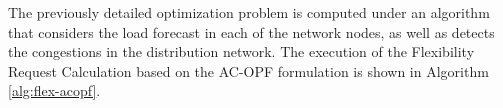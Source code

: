 \newpage
The previously detailed optimization problem is computed under an algorithm that considers the load forecast in each of the network nodes, as well as detects the congestions in the distribution network. The execution of the Flexibility Request Calculation based on the AC-OPF formulation is shown in Algorithm \ref{alg:flex-acopf}.




